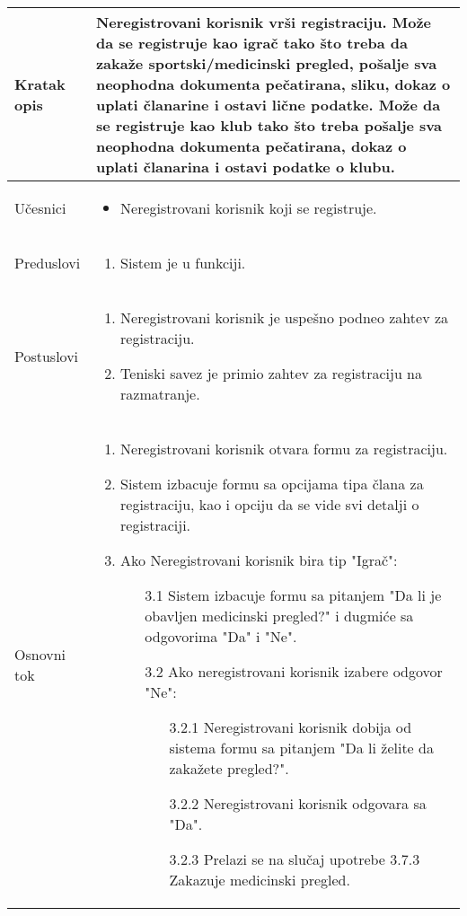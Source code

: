 \documentclass{article}
\begin{document}
        \begin{longtable}{| p{} | p{} |} 
            \hline
                Kratak opis & Neregistrovani korisnik vrši registraciju. Može da se registruje kao igrač tako što treba da zakaže sportski/medicinski pregled, pošalje sva neophodna dokumenta pečatirana, sliku, dokaz o uplati članarine i ostavi lične podatke. Može da se registruje kao klub tako što treba pošalje sva neophodna dokumenta pečatirana, dokaz o uplati članarina i ostavi podatke o klubu.\\ 
            \hline    
                Učesnici & \begin{itemize}
                    \item Neregistrovani korisnik koji se registruje.
                \end{itemize} \\
            \hline
               Preduslovi & \begin{enumerate}
                   \item Sistem je u funkciji.
               \end{enumerate}\\
            \hline  
                Postuslovi & \begin{enumerate}
                    \item Neregistrovani korisnik je uspešno podneo zahtev za registraciju.
                    \item Teniski savez je primio zahtev za registraciju na razmatranje.
                \end{enumerate}\\
            \hline
                Osnovni tok & \begin{enumerate}
                    \item Neregistrovani korisnik otvara formu za registraciju.
                    \item Sistem izbacuje formu sa opcijama tipa člana za registraciju, kao i opciju da se vide svi detalji o registraciji.
                    \item Ako Neregistrovani korisnik bira tip "Igrač":
                        \begin{enumerate}
                            \item[3.1] Sistem izbacuje formu sa pitanjem "Da li je obavljen medicinski pregled?" i dugmiće sa odgovorima "Da" i "Ne".
                            \item[3.2] Ako neregistrovani korisnik izabere odgovor "Ne":
                            \begin{enumerate}
                                \item[3.2.1] Neregistrovani korisnik dobija od sistema formu sa pitanjem "Da li želite da zakažete pregled?".
                                \item[3.2.2] Neregistrovani korisnik odgovara sa "Da".
                                \item[3.2.3] Prelazi se na slučaj upotrebe 3.7.3 Zakazuje medicinski pregled.


\end{enumerate}
\end{enumerate}
\end{enumerate}
\end{longtable}
\end{document}
